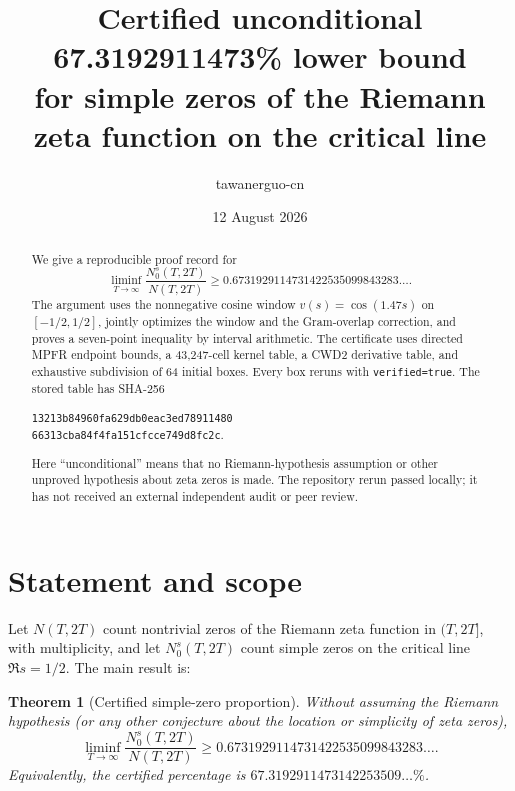 \documentclass[11pt]{article}
\title{\textbf{Certified unconditional 67.3192911473\% lower bound\\
for simple zeros of the Riemann zeta function on the critical line}}
\author{tawanerguo-cn}
\date{12 August 2026}
\newtheorem{theorem}{Theorem}[section]
\begin{document}
\maketitle

\begin{abstract}
We give a reproducible proof record for
\[
 \liminf_{T\to\infty}\frac{N_0^s(T,2T)}{N(T,2T)}
 \ge 0.6731929114731422535099843283\ldots .
\]
The argument uses the nonnegative cosine window $v(s)=\cos(1.47s)$ on
$[-1/2,1/2]$, jointly optimizes the window and the Gram-overlap correction,
and proves a seven-point inequality by interval arithmetic.  The certificate
uses directed MPFR endpoint bounds, a 43,247-cell kernel table, a CWD2
derivative table, and exhaustive
subdivision of 64 initial boxes.  Every box reruns with
\texttt{verified=true}.  The stored table has SHA-256
\par\smallskip\noindent
\small\texttt{13213b84960fa629db0eac3ed78911480}\\[-2pt]
\texttt{66313cba84f4fa151cfcce749d8fc2c}.
\par\smallskip
Here ``unconditional'' means that no Riemann-hypothesis assumption or other
unproved hypothesis about zeta zeros is made.  The repository rerun passed
locally; it has not received an external independent audit or peer review.
\end{abstract}

\begin{center}
\end{center}
\tableofcontents

\section{Statement and scope}
Let $N(T,2T)$ count nontrivial zeros of the Riemann zeta function in $(T,2T]$,
with multiplicity, and let $N_0^s(T,2T)$ count simple zeros on the critical
line $\Re s=1/2$.  The main result is:

\begin{theorem}[Certified simple-zero proportion]\label{thm:main}
Without assuming the Riemann hypothesis (or any other conjecture about the
location or simplicity of zeta zeros),
\begin{equation}
 \liminf_{T\to\infty}\frac{N_0^s(T,2T)}{N(T,2T)}
 \ge 0.6731929114731422535099843283\ldots .
 \label{eq:bound}
\end{equation}
Equivalently, the certified percentage is
$67.3192911473142253509\ldots\%$.
\end{theorem}
\end{document}

